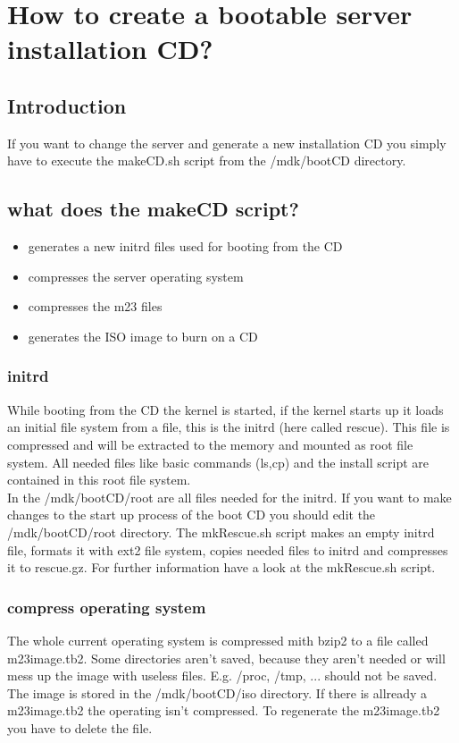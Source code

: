 \section{How to create a bootable server installation CD?}
\subsection{Introduction}
If you want to change the server and generate a new installation CD you simply have to execute the makeCD.sh script from the /mdk/bootCD directory.
\subsection{what does the makeCD script?}
\begin{itemize}
\item generates a new initrd files used for booting from the CD
\item compresses the server operating system
\item compresses the m23 files
\item generates the ISO image to burn on a CD
\end{itemize}
\subsubsection{initrd}
While booting from the CD the kernel is started, if the kernel starts up it loads an initial file system from a file, this is the initrd (here called rescue). This file is compressed and will be extracted to the memory and mounted as root file system. All needed files like basic commands (ls,cp) and the install script are contained in this root file system.\\
In the /mdk/bootCD/root are all files needed for the initrd. If you want to make changes to the start up process of the boot CD you should edit the /mdk/bootCD/root directory. The mkRescue.sh script makes an empty initrd file, formats it with ext2 file system, copies needed files to initrd and compresses it to rescue.gz. For further information have a look at the mkRescue.sh script.
\subsubsection{compress operating system}
The whole current operating system is compressed mith bzip2 to a file called m23image.tb2. Some directories aren't saved, because they aren't needed or will mess up the image with useless files. E.g. /proc, /tmp, ... should not be saved. The image is stored in the /mdk/bootCD/iso directory. If there is allready a m23image.tb2 the operating isn't compressed. To regenerate the m23image.tb2 you have to delete the file.
